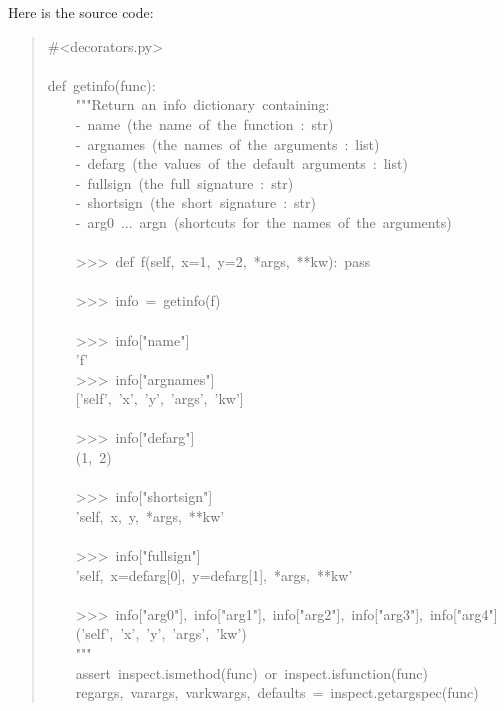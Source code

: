 \documentclass[10pt,a4paper,english]{article}
\begin{document}
Here is the source code:
\begin{quote}{\ttfamily \raggedright \noindent
{\#}<decorators.py>~\\
~\\
def~getinfo(func):~\\
~~~~"{}"{}"Return~an~info~dictionary~containing:~\\
~~~~-~name~(the~name~of~the~function~:~str)~\\
~~~~-~argnames~(the~names~of~the~arguments~:~list)~\\
~~~~-~defarg~(the~values~of~the~default~arguments~:~list)~\\
~~~~-~fullsign~(the~full~signature~:~str)~\\
~~~~-~shortsign~(the~short~signature~:~str)~\\
~~~~-~arg0~...~argn~(shortcuts~for~the~names~of~the~arguments)~\\
~\\
~~~~>{}>{}>~def~f(self,~x=1,~y=2,~*args,~**kw):~pass~\\
~\\
~~~~>{}>{}>~info~=~getinfo(f)~\\
~\\
~~~~>{}>{}>~info{[}"name"]~\\
~~~~'f'~\\
~~~~>{}>{}>~info{[}"argnames"]~\\
~~~~{[}'self',~'x',~'y',~'args',~'kw']~\\
~~~~~\\
~~~~>{}>{}>~info{[}"defarg"]~\\
~~~~(1,~2)~\\
~\\
~~~~>{}>{}>~info{[}"shortsign"]~\\
~~~~'self,~x,~y,~*args,~**kw'~\\
~~~~~\\
~~~~>{}>{}>~info{[}"fullsign"]~\\
~~~~'self,~x=defarg{[}0],~y=defarg{[}1],~*args,~**kw'~\\
~\\
~~~~>{}>{}>~info{[}"arg0"],~info{[}"arg1"],~info{[}"arg2"],~info{[}"arg3"],~info{[}"arg4"]~\\
~~~~('self',~'x',~'y',~'args',~'kw')~\\
~~~~"{}"{}"~\\
~~~~assert~inspect.ismethod(func)~or~inspect.isfunction(func)~\\
~~~~regargs,~varargs,~varkwargs,~defaults~=~inspect.getargspec(func)~\\
}
\end{quote}
\end{document}
